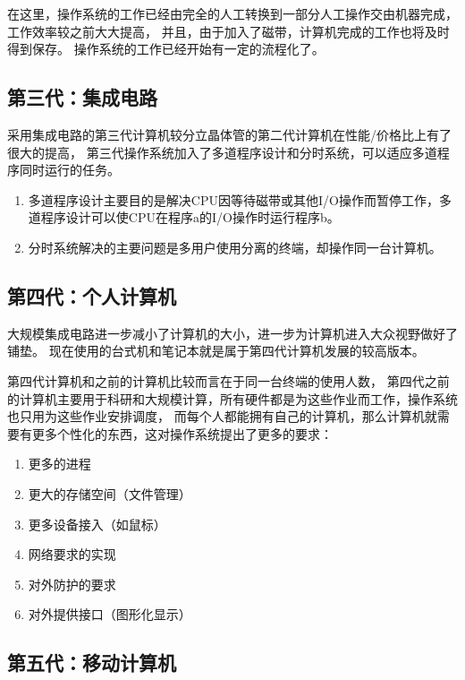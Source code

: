 在这里，操作系统的工作已经由完全的人工转换到一部分人工操作交由机器完成，工作效率较之前大大提高，
并且，由于加入了磁带，计算机完成的工作也将及时得到保存。
操作系统的工作已经开始有一定的流程化了。


\subsection{第三代：集成电路}

采用集成电路的第三代计算机较分立晶体管的第二代计算机在性能/价格比上有了很大的提高，
第三代操作系统加入了多道程序设计和分时系统，可以适应多道程序同时运行的任务。
\begin{enumerate}
  \item 多道程序设计主要目的是解决CPU因等待磁带或其他I/O操作而暂停工作，多道程序设计可以使CPU在程序a的I/O操作时运行程序b\cite{tanenbaum2009modern}。
  \item 分时系统解决的主要问题是多用户使用分离的终端，却操作同一台计算机。
\end{enumerate}


\subsection{第四代：个人计算机}

大规模集成电路进一步减小了计算机的大小，进一步为计算机进入大众视野做好了铺垫。
现在使用的台式机和笔记本就是属于第四代计算机发展的较高版本。

第四代计算机和之前的计算机比较而言在于同一台终端的使用人数，
第四代之前的计算机主要用于科研和大规模计算，所有硬件都是为这些作业而工作，操作系统也只用为这些作业安排调度，
而每个人都能拥有自己的计算机，那么计算机就需要有更多个性化的东西，这对操作系统提出了更多的要求：

\begin{enumerate}
  \item 更多的进程
  \item 更大的存储空间（文件管理）
  \item 更多设备接入（如鼠标）
  \item 网络要求的实现
  \item 对外防护的要求
  \item 对外提供接口（图形化显示）
\end{enumerate}


\subsection{第五代：移动计算机}

